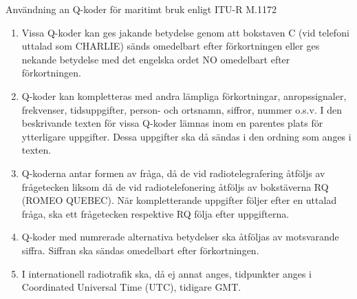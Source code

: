 Användning an Q-koder för maritimt bruk enligt ITU-R M.1172
\begin{enumerate}
	\item Vissa Q-koder kan ges jakande betydelse genom att bokstaven C
	(vid telefoni uttalad som CHARLIE) sänds omedelbart efter
	förkortningen eller ges nekande betydelse med det engelska ordet NO
	omedelbart efter förkortningen.
	\item Q-koder kan kompletteras med andra lämpliga förkortningar,
	anropssignaler, frekvenser, tidsuppgifter, person- och ortsnamn,
	siffror, nummer o.s.v. I den beskrivande texten för vissa Q-koder
	lämnas inom en parentes plats för ytterligare uppgifter. Dessa
	uppgifter ska då sändas i den ordning som anges i texten.
	\item Q-koderna antar formen av fråga, då de vid radiotelegrafering
	åtföljs av frågetecken liksom då de vid radiotelefonering åtföljs av
	bokstäverna RQ (ROMEO QUEBEC). När kompletterande uppgifter följer
	efter en uttalad fråga, ska ett frågetecken respektive RQ följa
	efter uppgifterna.
	\item Q-koder med numrerade alternativa betydelser ska åtföljas av
	motsvarande siffra. Siffran ska sändas omedelbart efter
	förkortningen.
	\item I internationell radiotrafik ska, då ej annat anges,
	tidpunkter anges i Coordinated Universal Time (UTC), tidigare GMT.
\end{enumerate}
